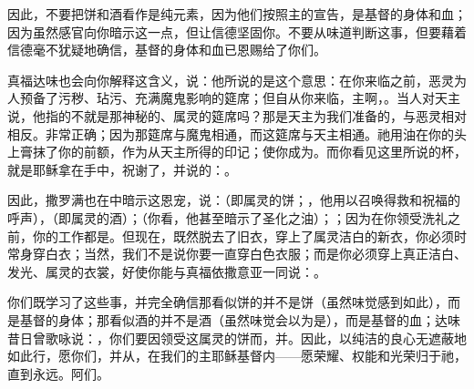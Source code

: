 因此，不要把饼和酒看作是纯元素，因为他们按照主的宣告，是基督的身体和血；因为虽然感官向你暗示这一点，但让信德坚固你。不要从味道判断这事，但要藉着信德毫不犹疑地确信，基督的身体和血已恩赐给了你们。\par

真福达味也会向你解释这含义，说：他所说的是这个意思：在你来临之前，恶灵为人预备了污秽、玷污、充满魔鬼影响的筵席；但自从你来临，主啊，。当人对天主说，他指的不就是那神秘的、属灵的筵席吗？那是天主为我们准备的，与恶灵相对相反。非常正确；因为那筵席与魔鬼相通，而这筵席与天主相通。祂用油在你的头上膏抹了你的前额，作为从天主所得的印记；使你成为。而你看见这里所说的杯，就是耶稣拿在手中，祝谢了，并说的：。\par

因此，撒罗满也在中暗示这恩宠，说：（即属灵的饼；，他用以召唤得救和祝福的呼声），（即属灵的酒）；（你看，他甚至暗示了圣化之油）；；因为在你领受洗礼之前，你的工作都是。但现在，既然脱去了旧衣，穿上了属灵洁白的新衣，你必须时常身穿白衣；当然，我们不是说你要一直穿白色衣服；而是你必须穿上真正洁白、发光、属灵的衣裳，好使你能与真福依撒意亚一同说：。\par

你们既学习了这些事，并完全确信那看似饼的并不是饼（虽然味觉感到如此），而是基督的身体；那看似酒的并不是酒（虽然味觉会以为是），而是基督的血；达味昔日曾歌咏说：，你们要因领受这属灵的饼而，并。因此，以纯洁的良心无遮蔽地如此行，愿你们，并从，在我们的主耶稣基督内——愿荣耀、权能和光荣归于祂，直到永远。阿们。\par



